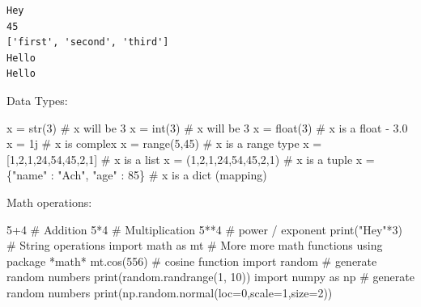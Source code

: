 \documentclass[
  letterpaper,
  DIV=11,
  numbers=noendperiod]{scrreprt}
\newenvironment{Shaded}{\begin{snugshade}}{\end{snugshade}}
\newcommand{\BuiltInTok}[1]{\textcolor[rgb]{0.00,0.23,0.31}{#1}}
\newcommand{\CommentTok}[1]{\textcolor[rgb]{0.37,0.37,0.37}{#1}}
\newcommand{\DecValTok}[1]{\textcolor[rgb]{0.68,0.00,0.00}{#1}}
\newcommand{\ImportTok}[1]{\textcolor[rgb]{0.00,0.46,0.62}{#1}}
\newcommand{\NormalTok}[1]{\textcolor[rgb]{0.00,0.23,0.31}{#1}}
\newcommand{\OperatorTok}[1]{\textcolor[rgb]{0.37,0.37,0.37}{#1}}
\newcommand{\OtherTok}[1]{\textcolor[rgb]{0.00,0.23,0.31}{#1}}
\newcommand{\StringTok}[1]{\textcolor[rgb]{0.13,0.47,0.30}{#1}}
\begin{document}
\begin{verbatim}
Hey
45
['first', 'second', 'third']
Hello
Hello
\end{verbatim}

Data Types:

\begin{Shaded}
\begin{Highlighting}[]
\NormalTok{x }\OperatorTok{=} \BuiltInTok{str}\NormalTok{(}\DecValTok{3}\NormalTok{)    }\CommentTok{\# x will be \textquotesingle{}3\textquotesingle{}}
\NormalTok{x }\OperatorTok{=} \BuiltInTok{int}\NormalTok{(}\DecValTok{3}\NormalTok{)    }\CommentTok{\# x will be 3}
\NormalTok{x }\OperatorTok{=} \BuiltInTok{float}\NormalTok{(}\DecValTok{3}\NormalTok{)  }\CommentTok{\# x is a float {-} 3.0}
\NormalTok{x }\OperatorTok{=} \OtherTok{1j}       \CommentTok{\# x is complex}
\NormalTok{x }\OperatorTok{=} \BuiltInTok{range}\NormalTok{(}\DecValTok{5}\NormalTok{,}\DecValTok{45}\NormalTok{)    }\CommentTok{\# x is a range type}
\NormalTok{x }\OperatorTok{=}\NormalTok{ [}\DecValTok{1}\NormalTok{,}\DecValTok{2}\NormalTok{,}\DecValTok{1}\NormalTok{,}\DecValTok{24}\NormalTok{,}\DecValTok{54}\NormalTok{,}\DecValTok{45}\NormalTok{,}\DecValTok{2}\NormalTok{,}\DecValTok{1}\NormalTok{]  }\CommentTok{\# x is a list}
\NormalTok{x }\OperatorTok{=}\NormalTok{ (}\DecValTok{1}\NormalTok{,}\DecValTok{2}\NormalTok{,}\DecValTok{1}\NormalTok{,}\DecValTok{24}\NormalTok{,}\DecValTok{54}\NormalTok{,}\DecValTok{45}\NormalTok{,}\DecValTok{2}\NormalTok{,}\DecValTok{1}\NormalTok{)  }\CommentTok{\# x is a tuple}
\NormalTok{x }\OperatorTok{=}\NormalTok{ \{}\StringTok{"name"}\NormalTok{ : }\StringTok{"Ach"}\NormalTok{, }\StringTok{"age"}\NormalTok{ : }\DecValTok{85}\NormalTok{\}  }\CommentTok{\# x is a dict (mapping)}
\end{Highlighting}
\end{Shaded}

Math operations:

\begin{Shaded}
\begin{Highlighting}[]
\DecValTok{5}\OperatorTok{+}\DecValTok{4}   \CommentTok{\# Addition}
\DecValTok{5}\OperatorTok{*}\DecValTok{4}   \CommentTok{\# Multiplication}
\DecValTok{5}\OperatorTok{**}\DecValTok{4}  \CommentTok{\# power / exponent}
\BuiltInTok{print}\NormalTok{(}\StringTok{"Hey"}\OperatorTok{*}\DecValTok{3}\NormalTok{) }\CommentTok{\# String operations}
\ImportTok{import}\NormalTok{ math }\ImportTok{as}\NormalTok{ mt }\CommentTok{\# More more math functions using package *math*}
\NormalTok{mt.cos(}\DecValTok{556}\NormalTok{) }\CommentTok{\# cosine function}
\ImportTok{import}\NormalTok{ random }\CommentTok{\# generate random numbers}
\BuiltInTok{print}\NormalTok{(random.randrange(}\DecValTok{1}\NormalTok{, }\DecValTok{10}\NormalTok{))}
\ImportTok{import}\NormalTok{ numpy }\ImportTok{as}\NormalTok{ np }\CommentTok{\# generate random numbers}
\BuiltInTok{print}\NormalTok{(np.random.normal(loc}\OperatorTok{=}\DecValTok{0}\NormalTok{,scale}\OperatorTok{=}\DecValTok{1}\NormalTok{,size}\OperatorTok{=}\DecValTok{2}\NormalTok{))}
\end{Highlighting}
\end{Shaded}
\end{document}

